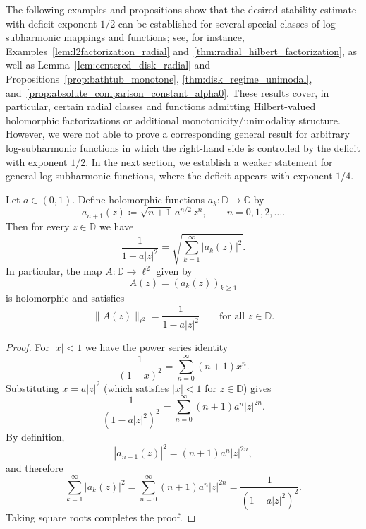 \documentclass[a4paper,10pt]{amsart}
\begin{document}
 
\begin{numrem}
The following examples and propositions show that the desired stability estimate with deficit exponent $1/2$ can be established for several special classes of log-subharmonic mappings and functions; see, for instance, Examples~\ref{lem:l2factorization_radial} and~\ref{thm:radial_hilbert_factorization}, as well as Lemma~\ref{lem:centered_disk_radial} and Propositions~\ref{prop:bathtub_monotone}, \ref{thm:disk_regime_unimodal}, and~\ref{prop:absolute_comparison_constant_alpha0}. These results cover, in particular, certain radial classes and functions admitting Hilbert-valued holomorphic factorizations or additional monotonicity/unimodality structure. However, we were not able to prove a corresponding general result for arbitrary log-subharmonic functions in which the right-hand side is controlled by the deficit with exponent $1/2$. In the next section, we establish a weaker statement for general log-subharmonic functions, where the deficit appears with exponent $1/4$.
\end{numrem}
\begin{numexamp}\label{lem:l2factorization_radial}
Let $a\in(0,1)$. Define holomorphic functions $a_k:\mathbb D\to\mathbb C$ by
\[
a_{n+1}(z)\coloneqq \sqrt{n+1}\,a^{n/2}\,z^{n},\qquad n=0,1,2,\dots .
\]
Then for every $z\in\mathbb D$ we have
\[
\frac{1}{1-a|z|^{2}}=\sqrt{\sum_{k=1}^{\infty}\lvert a_k(z)\rvert^{2}}.
\]
In particular, the map $A:\mathbb D\to \ell^{2}$ given by 
\[
A(z)=(a_k(z))_{k\ge1}
\]
is holomorphic and satisfies
\[
\|A(z)\|_{\ell^{2}}=\frac{1}{1-a|z|^{2}}
\qquad \text{for all } z\in\mathbb D.
\]
\end{numexamp}

\begin{proof}
For $|x|<1$ we have the power series identity
\[
\frac{1}{(1-x)^2}=\sum_{n=0}^{\infty}(n+1)x^{n}.
\]
Substituting $x=a|z|^{2}$ (which satisfies $|x|<1$ for $z\in\mathbb D$) gives
\[
\frac{1}{(1-a|z|^{2})^{2}}
=\sum_{n=0}^{\infty}(n+1)a^{n}|z|^{2n}.
\]
By definition,
\[
|a_{n+1}(z)|^{2}=(n+1)a^{n}|z|^{2n},
\]
and therefore
\[
\sum_{k=1}^{\infty}|a_k(z)|^{2}
=\sum_{n=0}^{\infty}(n+1)a^{n}|z|^{2n}
=\frac{1}{(1-a|z|^{2})^{2}}.
\]
Taking square roots completes the proof.
\end{proof}
\end{document}
